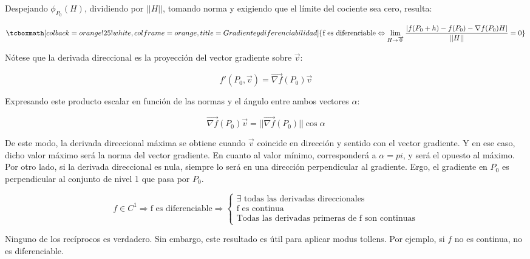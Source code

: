 \documentclass{article}
\begin{document}
Despejando $\phi_{P_0}(H)$, dividiendo por $||H||$, tomando norma y exigiendo que el límite del cociente sea cero, resulta:

\begin{equation}
\tcboxmath[colback=orange!25!white,colframe=orange, title=Gradiente y diferenciabilidad]
{ \text{f es diferenciable} \Leftrightarrow \lim_{H \rightarrow \overrightarrow{0}}\frac{ |f(P_0 + h) - f(P_0) - \nabla{f}(P_0) H| }{||H||} = 0 }
\end{equation}

Nótese que la derivada direccional es la proyección del vector gradiente sobre $\overrightarrow{v}$:

\begin{equation}
f'(P_0, \overrightarrow{v}) = \overrightarrow{ \nabla{f} }(P_0) \overrightarrow{v}
\end{equation}

Expresando este producto escalar en función de las normas y el ángulo entre ambos vectores $\alpha$:

\begin{equation}
\overrightarrow{ \nabla{f} }(P_0) \overrightarrow{v} = ||\overrightarrow{ \nabla{f} }(P_0)|| \cos \alpha
\end{equation}

De este modo, la derivada direccional máxima se obtiene cuando $\overrightarrow{v}$ coincide en dirección y sentido con el vector gradiente. Y en ese caso, dicho valor máximo será la norma del vector gradiente. En cuanto al valor mínimo, corresponderá a $\alpha=pi$, y será el opuesto al máximo. Por otro lado, si la derivada direccional es nula, siempre lo será en una dirección perpendicular al gradiente. Ergo, el gradiente en $P_0$ es perpendicular al conjunto de nivel 1 que pasa por $P_0$.

\begin{equation}
f \in C^1 \Rightarrow \text{f es diferenciable} \Rightarrow \left\{
\begin{array}{ll}
\exists \text{ todas las derivadas direccionales} \\
\text{f es continua} \\
\text{Todas las derivadas primeras de f son continuas}
\end{array}
\right.
\end{equation}

Ninguno de los recíprocos es verdadero. Sin embargo, este resultado es útil para aplicar modus tollens. Por ejemplo, si $f$ no es continua, no es diferenciable.
\end{document}
